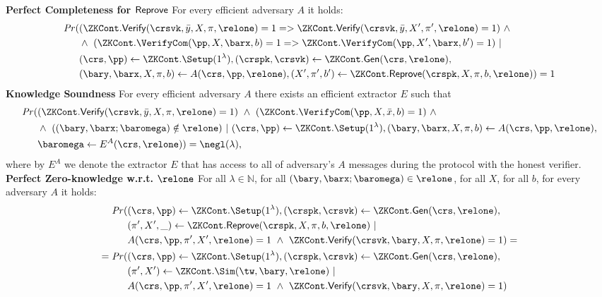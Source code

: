 \begin{definition}[ZK Continuations]
\noindent \textbf{Perfect Completeness for ${\mathsf{Reprove}}$} For every efficient adversary $A$ it holds: 
\begin{align*}
\mathit{Pr} (& (\ZKCont.\Verify(\crsvk, \bar{y}, X, \pi, \relone) = 1  = >  \ZKCont.\Verify(\crsvk, \bar{y}, X', \pi', \relone) = 1)  \ \wedge \  \\
                   & \wedge \ (\ZKCont.\VerifyCom (\pp, X, \barx, b) = 1 => \ZKCont.\VerifyCom (\pp, X', \barx, b') = 1) \ | \\
                   & (\crs, \pp) \leftarrow \ZKCont.\Setup (1^{\lambda}), (\crspk, \crsvk) \leftarrow \ZKCont.\Gen(\crs, \relone), \\ 
                   & (\bary, \barx, X, \pi, b) \leftarrow A(\crs,\pp, \relone), (X', \pi', b') \leftarrow \ZKCont.\Reprove(\crspk, X, \pi, b, \relone)) = 1
\end{align*}
\noindent \textbf{Knowledge Soundness} For every efficient adversary $A$ there exists an efficient extractor $E$ such that 
\begin{align*}
\mathit{Pr} (& (\ZKCont.\Verify(\crsvk, \bar{y}, X, \pi, \relone) = 1) \ \wedge \ (\ZKCont.\VerifyCom(\pp, X, \bar{x}, b) = 1) \ \wedge\ \\
                   & \wedge \ ( (\bary, \barx; \baromega) \notin \relone) \ | \ (\crs, \pp) \leftarrow \ZKCont.\Setup (1^{\lambda}), (\bary, \barx, X, \pi, b) \leftarrow A(\crs, \pp, \relone), \\ 
& \baromega \leftarrow E^{A}(\crs, \relone)) = \negl (\lambda),
\end{align*}
\noindent %
where by $ E^{A}$ we denote the extractor $E$ that has access to all of adversary's $A$ messages during the protocol with the honest verifier. \\

\noindent \textbf{Perfect Zero-knowledge w.r.t. $\relone$} For all $\lambda \in \mathbb{N}$, for all  $(\bary, \barx; \baromega) \in \relone$, for all $X$, for all $b$, 
for every adversary $A$ it holds:
\begin{align*}
\mathit{Pr}(&(\crs, \pp) \leftarrow \ZKCont.\Setup (1^{\lambda}), (\crspk, \crsvk) \leftarrow \ZKCont.\Gen(\crs, \relone), \\ 
                  & (\pi', X', \_) \leftarrow \ZKCont.\Reprove (\crspk, X, \pi, b, \relone) \ | \\ 
                  & A(\crs, \pp, \pi', X', \relone)= 1 \ \wedge \ \ZKCont.\Verify(\crsvk, \bary, X, \pi, \relone) = 1) =  \\
= \mathit{Pr}(&(\crs, \pp) \leftarrow \ZKCont.\Setup (1^{\lambda}), (\crspk, \crsvk) \leftarrow \ZKCont.\Gen(\crs, \relone), \\
                     & (\pi', X') \leftarrow \ZKCont.\Sim(\tw, \bary, \relone) \ | \\ 
                     & A(\crs, \pp, \pi', X', \relone) = 1 \ \wedge \ \ZKCont.\Verify(\crsvk, \bary, X, \pi, \relone) = 1)
\end{align*}
 

\end{definition}
